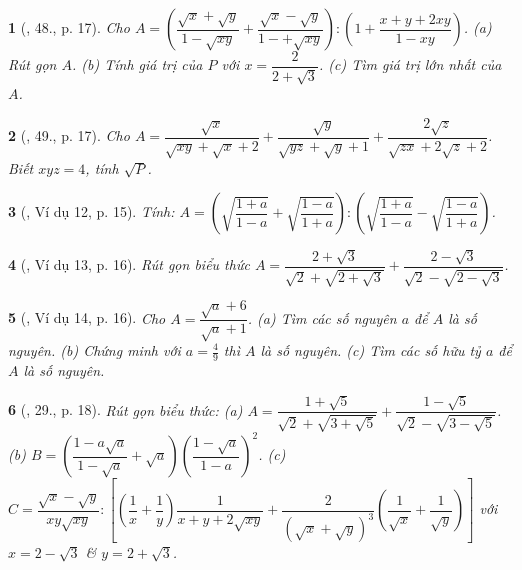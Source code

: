 \documentclass{article}
\newtheorem{baitoan}{}%
\begin{document}
\begin{baitoan}[\cite{Tuyen_Toan_9_old}, 48., p. 17]
	Cho $A = \left(\dfrac{\sqrt{x} + \sqrt{y}}{1 - \sqrt{xy}} + \dfrac{\sqrt{x} - \sqrt{y}}{1 -+ \sqrt{xy}}\right):\left(1 + \dfrac{x + y + 2xy}{1 - xy}\right)$. (a) Rút gọn $A$. (b) Tính giá trị của $P$ với $x = \dfrac{2}{2 + \sqrt{3}}$. (c) Tìm giá trị lớn nhất của $A$.
\end{baitoan}

\begin{baitoan}[\cite{Tuyen_Toan_9_old}, 49., p. 17]
	Cho $A = \dfrac{\sqrt{x}}{\sqrt{xy} + \sqrt{x} + 2} + \dfrac{\sqrt{y}}{\sqrt{yz} + \sqrt{y} + 1} + \dfrac{2\sqrt{z}}{\sqrt{zx} + 2\sqrt{z} + 2}$. Biết $xyz = 4$, tính $\sqrt{P}$.
\end{baitoan}

\begin{baitoan}[\cite{Binh_Toan_9_tap_1}, Ví dụ 12, p. 15]
	Tính: $A = \left(\sqrt{\dfrac{1 + a}{1 - a}} + \sqrt{\dfrac{1 - a}{1 + a}}\right):\left(\sqrt{\dfrac{1 + a}{1 - a}} - \sqrt{\dfrac{1 - a}{1 + a}}\right)$.
\end{baitoan}

\begin{baitoan}[\cite{Binh_Toan_9_tap_1}, Ví dụ 13, p. 16]
	Rút gọn biểu thức $A = \dfrac{2 + \sqrt{3}}{\sqrt{2} + \sqrt{2 + \sqrt{3}}} + \dfrac{2 - \sqrt{3}}{\sqrt{2} - \sqrt{2 - \sqrt{3}}}$.
\end{baitoan}

\begin{baitoan}[\cite{Binh_Toan_9_tap_1}, Ví dụ 14, p. 16]
	Cho $A = \dfrac{\sqrt{a} + 6}{\sqrt{a} + 1}$. (a) Tìm các số nguyên $a$ để $A$ là số nguyên. (b) Chứng minh với $a = \frac{4}{9}$ thì $A$ là số nguyên. (c) Tìm các số hữu tỷ $a$ để $A$ là số nguyên.
\end{baitoan}

\begin{baitoan}[\cite{Binh_Toan_9_tap_1}, 29., p. 18]
	Rút gọn biểu thức: (a) $A = \dfrac{1 + \sqrt{5}}{\sqrt{2} + \sqrt{3 + \sqrt{5}}} + \dfrac{1 - \sqrt{5}}{\sqrt{2} - \sqrt{3 - \sqrt{5}}}$.\\(b) $B = \left(\dfrac{1 - a\sqrt{a}}{1 - \sqrt{a}} + \sqrt{a}\right)\left(\dfrac{1 - \sqrt{a}}{1 - a}\right)^2$. (c) $C = \dfrac{\sqrt{x} - \sqrt{y}}{xy\sqrt{xy}}:\left[\left(\dfrac{1}{x} + \dfrac{1}{y}\right)\dfrac{1}{x + y+ 2\sqrt{xy}} + \dfrac{2}{(\sqrt{x} + \sqrt{y})^3}\left(\dfrac{1}{\sqrt{x}} + \dfrac{1}{\sqrt{y}}\right)\right]$ với $x = 2 - \sqrt{3}$ \& $y = 2 + \sqrt{3}$.
\end{baitoan}
\end{document}
